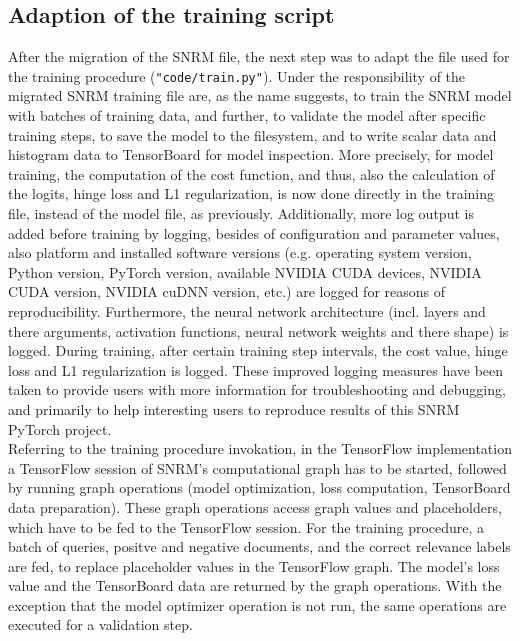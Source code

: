 \subsection{Adaption of the training script}
After the migration of the SNRM file, the next step was to adapt the file used for the 
    training procedure (\texttt{"code/train.py"}).
Under the responsibility of the migrated SNRM training file are, as the name suggests,
    to train the SNRM model with batches of training data,
    and further, to validate the model after specific training steps,
    to save the model to the filesystem, and
    to write scalar data and histogram data to TensorBoard for model inspection.
More precisely, for model training, the computation of the cost function, and thus,
    also the calculation of the logits, hinge loss and L1 regularization, is now done
    directly in the training file, instead of the model file, as previously.
Additionally, more log output is added before training by logging, besides of configuration and parameter
    values, also platform and installed software versions 
    (e.g. operating system version, Python version, PyTorch version, available NVIDIA CUDA devices, 
    NVIDIA CUDA version, NVIDIA cuDNN version, etc.)
    are logged for reasons of reproducibility.
Furthermore, the neural network architecture (incl. layers and there arguments, activation functions, 
    neural network weights and there shape) is logged.
During training, after certain training step intervals, the cost value, hinge loss and 
    L1 regularization is logged.
These improved logging measures have been taken to provide users with more information for 
    troubleshooting and debugging, and primarily to help interesting users to reproduce 
    results of this SNRM PyTorch project.\\
Referring to the training procedure invokation, in the TensorFlow implementation 
    a TensorFlow session of SNRM's computational graph has to be started, 
    followed by running graph operations (model optimization, loss computation, TensorBoard data preparation).
These graph operations access graph values and placeholders, which have to be fed to the
    TensorFlow session.
For the training procedure, a batch of queries, positve and negative documents, and the correct 
    relevance labels are fed, to replace placeholder values in the TensorFlow graph.
The model's loss value and the TensorBoard data are returned by the graph operations.
With the exception that the model optimizer operation is not run, the same operations 
    are executed for a validation step.\\
